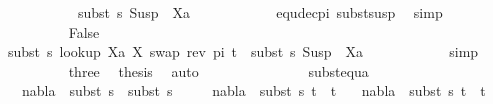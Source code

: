 \begin{isabellebody}
\ \ \ \ \ \ \ \ \ \ {\isasymapprox}\ subst\ s\ {\isacharparenleft}{\kern0pt}Susp\ {\isacharbrackleft}{\kern0pt}{\isacharbrackright}{\kern0pt}\ Xa{\isacharparenright}{\kern0pt}{\isachardoublequoteclose}\isanewline
\ \ \ \ \ \ \ \ \ \ \isamarkupfalse%
\ equ{\isacharunderscore}{\kern0pt}dec{\isacharunderscore}{\kern0pt}pi\ subst{\isacharunderscore}{\kern0pt}susp\ \isamarkupfalse%
\ simp\isanewline
\ \ \ \ \ \ \isamarkupfalse%
\isanewline
\ \ \ \ \ \ \ \ \isamarkupfalse%
\ False\isanewline
\ \ \ \ \ \ \ \ \isamarkupfalse%
\ {\isachardoublequoteopen}subst\ s\ {\isacharparenleft}{\kern0pt}look{\isacharunderscore}{\kern0pt}up\ Xa\ {\isacharbrackleft}{\kern0pt}{\isacharparenleft}{\kern0pt}X{\isacharcomma}{\kern0pt}\ swap\ {\isacharparenleft}{\kern0pt}rev\ pi{\isacharparenright}{\kern0pt}\ t{\isacharparenright}{\kern0pt}{\isacharbrackright}{\kern0pt}{\isacharparenright}{\kern0pt}\ {\isacharequal}{\kern0pt}\ subst\ s\ {\isacharparenleft}{\kern0pt}Susp\ {\isacharbrackleft}{\kern0pt}{\isacharbrackright}{\kern0pt}\ Xa{\isacharparenright}{\kern0pt}{\isachardoublequoteclose}\isanewline
\ \ \ \ \ \ \ \ \ \ \isamarkupfalse%
\ simp\isanewline
\ \ \ \ \ \ \ \ \isamarkupfalse%
\ three\ \isamarkupfalse%
\ {\isacharquery}{\kern0pt}thesis\ \isamarkupfalse%
\ auto\isanewline
\ \ \ \ \ \ \isamarkupfalse%
\isanewline
\ \ \ \ \isamarkupfalse%
\isanewline
\ \ \isamarkupfalse%
%
\endisatagproof
{\isafoldproof}%
%
\isadelimproof
\isanewline
%
\endisadelimproof
\isanewline
{}\isamarkupfalse%
\ subst{\isacharunderscore}{\kern0pt}equ{\isacharunderscore}{\kern0pt}a{\isacharcolon}{\kern0pt}\isanewline
\ \ \ {\isachardoublequoteopen}nabla\ {\isasymTurnstile}\ {\isacharparenleft}{\kern0pt}subst\ s{}{\isacharparenright}{\kern0pt}\ {\isasymapprox}\ {\isacharparenleft}{\kern0pt}subst\ s{}{\isacharparenright}{\kern0pt}{\isachardoublequoteclose}\isanewline
\ \ \ \ \ {\isachardoublequoteopen}nabla\ {\isasymturnstile}\ {\isacharparenleft}{\kern0pt}subst\ s{}\ t{}{\isacharparenright}{\kern0pt}\ {\isasymapprox}\ t{}{\isachardoublequoteclose}\isanewline
\ \ \ {\isachardoublequoteopen}nabla\ {\isasymturnstile}\ {\isacharparenleft}{\kern0pt}subst\ s{}\ t{}{\isacharparenright}{\kern0pt}\ {\isasymapprox}\ t{}{\isachardoublequoteclose}\isanewline

\end{isabellebody}
